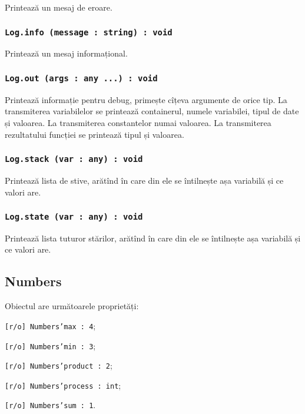 Printează un mesaj de eroare.

\subsubsection{\texttt{Log.info (message : string) : void}}

Printează un mesaj informațional.

\subsubsection{\texttt{Log.out (args : any ...) : void}}

Printează informație pentru debug, primește cîțeva argumente de orice tip. La transmiterea variabilelor se printează containerul, numele variabilei, tipul de date și valoarea. La transmiterea constantelor numai valoarea. La transmiterea rezultatului funcției se printează tipul și valoarea.

\subsubsection{\texttt{Log.stack (var : any) : void}}

Printează lista de stive, arătînd în care din ele se întilnește așa variabilă și ce valori are.

\subsubsection{\texttt{Log.state (var : any) : void}}

Printează lista tuturor stărilor, arătînd în care din ele se întilnește așa variabilă și ce valori are.

\subsection{{\color{orange} Numbers}}

Obiectul \numbers{} are următoarele proprietăți:
\begin{icItems}
	\item \texttt{[r/o] Numbers'max : 4};
	\item \texttt{[r/o] Numbers'min : 3};
	\item \texttt{[r/o] Numbers'product : 2};
	\item \texttt{[r/o] Numbers'process : int};
	\item \texttt{[r/o] Numbers'sum : 1}.
\end{icItems}

